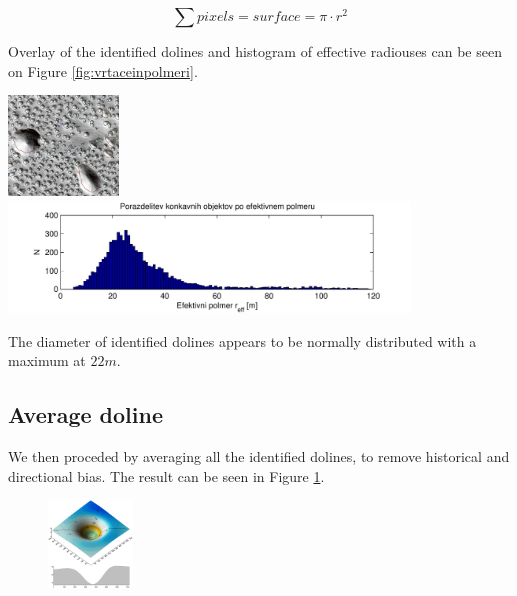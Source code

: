 \documentclass[a0,portrait]{a0poster}
\begin{document}
\begin{multicols}{2}
\begin{equation}
	\sum pixels = surface = \pi \cdot r^2
	\label{eq:reff}
\end{equation}

Overlay of the identified dolines and histogram of effective radiouses can be seen on Figure \ref{fig:vrtaceinpolmeri}.

\begin{minipage}[b]{0.5\textwidth}
	\includegraphics[width=0.22\textwidth]{menisija-vrtace}
	\includegraphics[width=0.8\textwidth]{menisija-polmeri-hist}
	\label{fig:vrtaceinpolmeri}
\end{minipage}

The diameter of identified dolines appears to be normally distributed with a maximum at $22m$.


\subsection*{Average doline}

We then proceded by averaging all the identified dolines, to remove historical and directional bias. The result can be seen in Figure \ref{fig:vrtaca}.

\begin{figure}
\begin{center}
	\includegraphics[width=0.2\textwidth]{menisija-vrtaca.png}
	\label{fig:vrtaca}
\end{center}
\end{figure}


\end{multicols}
\end{document}
